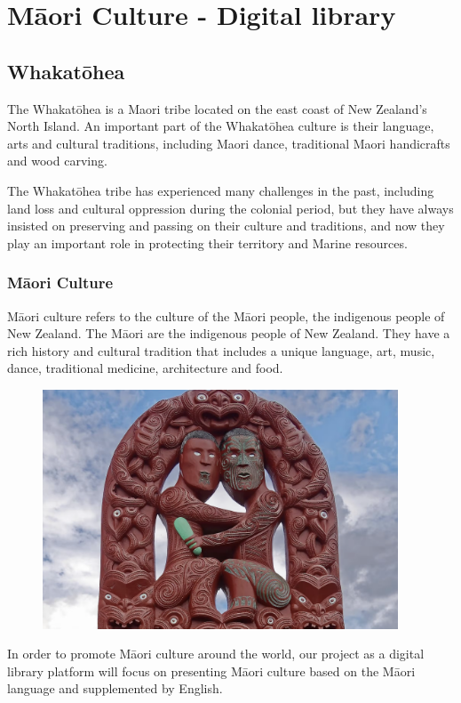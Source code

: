 \chapter{Māori Culture - Digital library}

\section{Whakatōhea}
The Whakatōhea is a Maori tribe located on the east coast of New Zealand's North Island. An important part of the Whakatōhea culture is their language, arts and cultural traditions, including Maori dance, traditional Maori handicrafts and wood carving\cite{AboutUsW69:online}.

The Whakatōhea tribe has experienced many challenges in the past, including land loss and cultural oppression during the colonial period, but they have always insisted on preserving and passing on their culture and traditions, and now they play an important role in protecting their territory and Marine resources\cite{Aboutthi61:online}.

\subsection{Māori Culture}
Māori culture refers to the culture of the Māori people, the indigenous people of New Zealand. The Māori are the indigenous people of New Zealand. They have a rich history and cultural tradition that includes a unique language, art, music, dance, traditional medicine, architecture and food.

\begin{figure}[htbp]
  \centerline{\includegraphics[width=300pt]{images/M1-1.png}}
\end{figure}

In order to promote Māori culture around the world, our project as a digital library platform will focus on presenting Māori culture based on the Māori language and supplemented by English.

